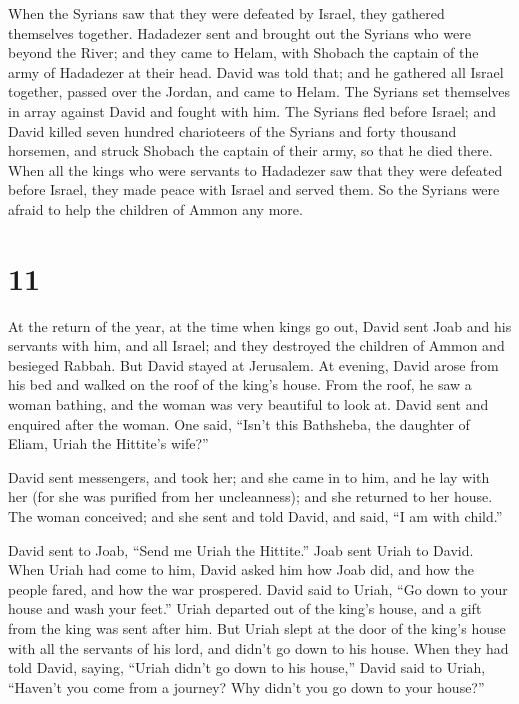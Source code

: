  When the Syrians saw that they were defeated by Israel,
they gathered themselves together.  Hadadezer sent and
brought out the Syrians who were beyond the River; and they came to
Helam, with Shobach the captain of the army of Hadadezer at their head.
 David was told that; and he gathered all Israel
together, passed over the Jordan, and came to Helam. The Syrians set
themselves in array against David and fought with him. 
The Syrians fled before Israel; and David killed seven hundred
charioteers of the Syrians and forty thousand horsemen, and struck
Shobach the captain of their army, so that he died there.
 When all the kings who were servants to Hadadezer saw
that they were defeated before Israel, they made peace with Israel and
served them. So the Syrians were afraid to help the children of Ammon
any more.

\hypertarget{section-10}{%
\section{11}\label{section-10}}

 At the return of the year, at the time when kings go out,
David sent Joab and his servants with him, and all Israel; and they
destroyed the children of Ammon and besieged Rabbah. But David stayed at
Jerusalem.  At evening, David arose from his bed and
walked on the roof of the king's house. From the roof, he saw a woman
bathing, and the woman was very beautiful to look at. 
David sent and enquired after the woman. One said, ``Isn't this
Bathsheba, the daughter of Eliam, Uriah the Hittite's wife?''

 David sent messengers, and took her; and she came in to
him, and he lay with her (for she was purified from her uncleanness);
and she returned to her house.  The woman conceived; and
she sent and told David, and said, ``I am with child.''

 David sent to Joab, ``Send me Uriah the Hittite.'' Joab
sent Uriah to David.  When Uriah had come to him, David
asked him how Joab did, and how the people fared, and how the war
prospered.  David said to Uriah, ``Go down to your house
and wash your feet.'' Uriah departed out of the king's house, and a gift
from the king was sent after him.  But Uriah slept at the
door of the king's house with all the servants of his lord, and didn't
go down to his house.  When they had told David, saying,
``Uriah didn't go down to his house,'' David said to Uriah, ``Haven't
you come from a journey? Why didn't you go down to your house?''

